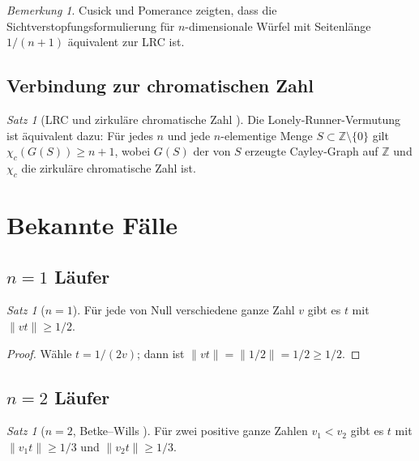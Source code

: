 \documentclass[12pt,a4paper]{amsart}
\theoremstyle{definition}
\theoremstyle{remark}
\newtheorem{satz}[theorem]{Satz}
\newtheorem{bemerkung}[theorem]{Bemerkung}
\newcommand{\Z}{\mathbb{Z}}
\begin{document}
\begin{bemerkung}
Cusick und Pomerance \cite{CusickPomerance1984} zeigten, dass die
Sichtverstopfungsformulierung für $n$-dimensionale Würfel mit Seitenlänge $1/(n+1)$
äquivalent zur LRC ist.
\end{bemerkung}

\subsection{Verbindung zur chromatischen Zahl}

\begin{satz}[LRC und zirkuläre chromatische Zahl \cite{TothCayley2001}]\label{satz:chrom}
Die Lonely-Runner-Vermutung ist äquivalent dazu: Für jedes $n$ und jede
$n$-elementige Menge $S \subset \Z \setminus \{0\}$ gilt
$\chi_c(G(S)) \geq n+1$,
wobei $G(S)$ der von $S$ erzeugte Cayley-Graph auf $\Z$ und $\chi_c$ die
zirkuläre chromatische Zahl ist.
\end{satz}

\section{Bekannte Fälle}\label{sec:bekannt}

\subsection{$n = 1$ Läufer}

\begin{satz}[$n = 1$]\label{satz:n1}
Für jede von Null verschiedene ganze Zahl $v$ gibt es $t$ mit $\|vt\| \geq 1/2$.
\end{satz}
\begin{proof}
Wähle $t = 1/(2v)$; dann ist $\|vt\| = \|1/2\| = 1/2 \geq 1/2$. \end{proof}

\subsection{$n = 2$ Läufer}

\begin{satz}[$n = 2$, Betke--Wills \cite{BetkeWills1972}]\label{satz:n2}
Für zwei positive ganze Zahlen $v_1 < v_2$ gibt es $t$ mit
$\|v_1 t\| \geq 1/3$ und $\|v_2 t\| \geq 1/3$.
\end{satz}
\end{document}
